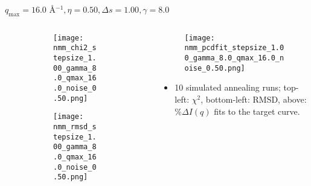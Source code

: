 \documentclass{beamer}
\begin{document}
\begin{frame}{$ q_{\textrm{max}}=16.0 $ \AA $^{-1}, \eta=0.50, \Delta s=1.00, \gamma=8.0$}
	\begin{columns}
		\begin{column}{.5\textwidth}
			\begin{figure}[H]
			\centering
			\begin{subfigure}[b]{\textwidth}
				\centering
				\texttt{[image: nmm\_chi2\_stepsize\_1.00\_gamma\_8.0\_qmax\_16.0\_noise\_0.50.png]}
				\label{fig:}
			\end{subfigure}
			\begin{subfigure}[b]{\textwidth}
				\centering
				\texttt{[image: nmm\_rmsd\_stepsize\_1.00\_gamma\_8.0\_qmax\_16.0\_noise\_0.50.png]}
				\label{fig:}
			\end{subfigure}
			\end{figure}
		\end{column}
		\begin{column}{.5\textwidth}
			\begin{figure}[H]
				\centering
				\texttt{[image: nmm\_pcdfit\_stepsize\_1.00\_gamma\_8.0\_qmax\_16.0\_noise\_0.50.png]}
				\label{fig:}
			\end{figure}
			\begin{itemize}
				\item 10 simulated annealing runs; top-left: $\chi^2$, bottom-left: RMSD, above: $\%\Delta I(q)$ fits to the target curve.
			\end{itemize}
		\end{column}
	\end{columns}
\end{frame}
 
\end{document}
